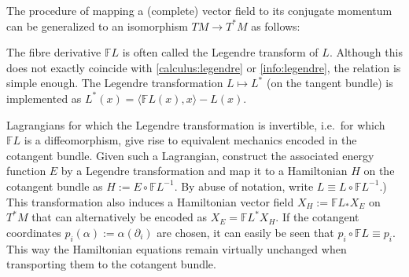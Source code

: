     The procedure of mapping a (complete) vector field to its conjugate momentum can be generalized to an isomorphism $TM\rightarrow T^*M$ as follows:
    \begin{remark}
        The fibre derivative $\mathbb{F}L$ is often called the Legendre transform of $L$. Although this does not exactly coincide with \ref{calculus:legendre} or \eqref{info:legendre}, the relation is simple enough. The Legendre transformation $L\mapsto L^*$ (on the tangent bundle) is implemented as $L^*(x) = \langle\mathbb{F}L(x),x\rangle - L(x)$.
    \end{remark}
    Lagrangians for which the Legendre transformation is invertible, i.e.~for which $\mathbb{F}L$ is a diffeomorphism, give rise to equivalent mechanics encoded in the cotangent bundle. Given such a Lagrangian, construct the associated energy function $E$ by a Legendre transformation and map it to a Hamiltonian $H$ on the cotangent bundle as $H:=E\circ\mathbb{F}L^{-1}$. By abuse of notation, write $L\equiv L\circ\mathbb{F}L^{-1}$.) This transformation also induces a Hamiltonian vector field $X_H:=\mathbb{F}L_*X_E$ on $T^*M$ that can alternatively be encoded as $X_E=\mathbb{F}L^*X_H$. If the cotangent coordinates $p_i(\alpha) := \alpha(\partial_i)$ are chosen, it can easily be seen that $p_i\circ\mathbb{F}L\equiv p_i$. This way the Hamiltonian equations remain virtually unchanged when transporting them to the cotangent bundle.

